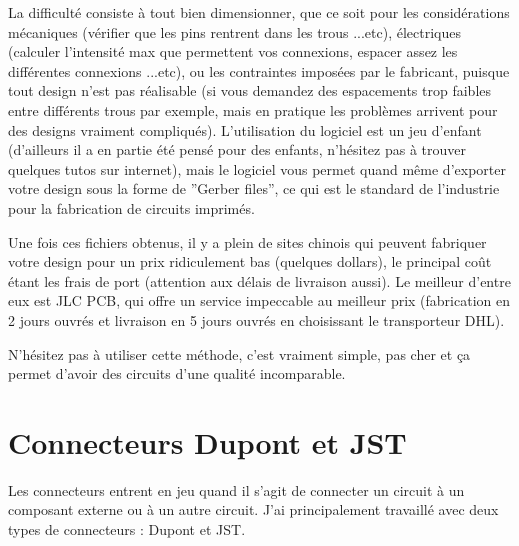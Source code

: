 \documentclass[a4paper, 11pt]{report}
\begin{document}
La difficulté consiste à tout bien dimensionner, que ce soit pour
les considérations mécaniques (vérifier que les pins rentrent dans
les trous ...etc), électriques (calculer l'intensité max que permettent
vos connexions, espacer assez les différentes connexions ...etc),
ou les contraintes imposées par le fabricant, puisque tout design
n'est pas réalisable (si vous demandez des espacements trop faibles
entre différents trous par exemple, mais en pratique les problèmes
arrivent pour des designs vraiment compliqués). L'utilisation du logiciel
est un jeu d'enfant (d'ailleurs il a en partie été pensé pour des
enfants, n'hésitez pas à trouver quelques tutos sur internet), mais
le logiciel vous permet quand même d'exporter votre design sous la
forme de ''Gerber files'', ce qui est le standard de l'industrie
pour la fabrication de circuits imprimés.

Une fois ces fichiers obtenus, il y a plein de sites chinois qui peuvent
fabriquer votre design pour un prix ridiculement bas (quelques dollars),
le principal coût étant les frais de port (attention aux délais de
livraison aussi). Le meilleur d'entre eux est JLC PCB, qui offre un
service impeccable au meilleur prix (fabrication en 2 jours ouvrés
et livraison en 5 jours ouvrés en choisissant le transporteur DHL).

N'hésitez pas à utiliser cette méthode, c'est vraiment simple, pas
cher et ça permet d'avoir des circuits d'une qualité incomparable.

\section{Connecteurs Dupont et JST}

Les connecteurs entrent en jeu quand il s'agit de connecter un circuit
à un composant externe ou à un autre circuit. J'ai principalement
travaillé avec deux types de connecteurs : Dupont et JST.
\end{document}
